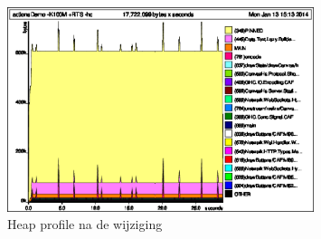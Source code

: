 \begin{figure}[H]
\begin{center}
\includegraphics[keepaspectratio,width=0.8\textwidth]{./images/actionsDemoAfterByteStrings.eps}
\caption{Heap profile na de wijziging}
\label{fig:performance2}
\end{center}
\end{figure}
